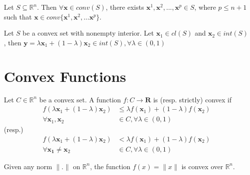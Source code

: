 			\begin{theorem}
				Let $S \subseteq \mathbb{R}^n$. Then $\forall \mathbf{x} \in conv(S)$, there exists $\mathbf{x}^1, \mathbf{x}^2, ..., \mathbf{x}^p \in S$, where $p\le n+1$ such that $\mathbf{x} \in conv\{\mathbf{x}^1, \mathbf{x}^2, ... \mathbf{x}^p\}$.
			\end{theorem}


			\begin{theorem}
				Let $S$ be a convex set with nonempty interior. Let $\mathbf{x}_1 \in cl(S)$ and $\mathbf{x}_2 \in int(S)$, then $\mathbf{y} = \lambda \mathbf{x}_1 + (1 - \lambda) \mathbf{x}_2 \in int(S), \forall \lambda \in (0, 1)$
			\end{theorem}

		\section{Convex Functions}
			\begin{definition}
				Let $C \in \mathbb{R}^n$ be a convex set. A function $f: C \rightarrow \mathbf{R}$ is (resp. strictly) convex if
				\begin{align}
					f(\lambda \mathbf{x}_1 + (1 - \lambda) \mathbf{x}_2) &\le \lambda f(\mathbf{x}_1) + (1 - \lambda) f(\mathbf{x}_2) \\ \forall \mathbf{x}_1, \mathbf{x}_2 &\in C, \forall \lambda \in (0, 1)
				\end{align}
				(resp.)
				\begin{align}
					f(\lambda \mathbf{x}_1 + (1 - \lambda) \mathbf{x}_2) &< \lambda f(\mathbf{x}_1) + (1 - \lambda) f(\mathbf{x}_2) \\ \forall \mathbf{x_1} \neq \mathbf{x}_2 &\in C, \forall \lambda \in (0, 1)
				\end{align}
			\end{definition}


			\begin{example}
				Given any norm $\|.\|$ on $\mathbb{R}^n$, the function $f(x) = \|x\|$ is convex over $\mathbb{R}^n$.
			\end{example}


